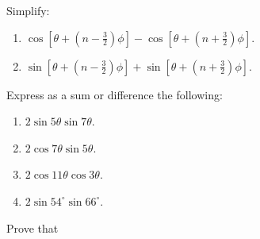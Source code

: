 Simplify:

\begin{enumerate}[resume]
\item $\cos\left[\theta + \left(n - \frac{3}{2}\right)\phi\right] - \cos\left[\theta + \left(n + \frac{3}{2}\right)\phi\right]$.

\item $\sin\left[\theta + \left(n - \frac{3}{2}\right)\phi\right] + \sin\left[\theta + \left(n + \frac{3}{2}\right)\phi\right]$.
\end{enumerate}

Express as a sum or difference the  following:

\begin{enumerate}[resume]
\item $2\sin5\theta\sin7\theta$.

\item $2\cos7\theta\sin5\theta$.

\item $2\cos 11\theta\cos 3\theta$.

\item $2\sin54^\circ\sin66^\circ$.
\end{enumerate}

Prove that

